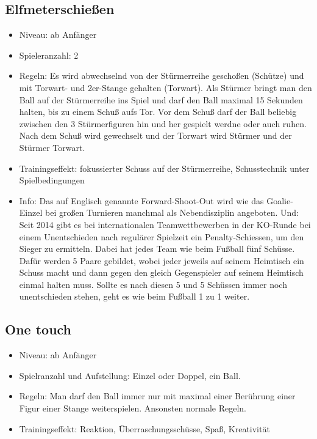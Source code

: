 \subsection{Elfmeterschießen}
\label{spielformen:sonderregeln:elfmeter}

\begin{itemize}
\item Niveau: ab Anfänger
\item Spieleranzahl: 2
\item Regeln: Es wird abwechselnd von der Stürmerreihe geschoßen (Schütze) und mit Torwart- und 2er-Stange gehalten (Torwart). Als Stürmer bringt man den Ball auf der Stürmerreihe ins Spiel und darf den Ball maximal 15 Sekunden halten, bis zu einem Schuß aufs Tor. Vor dem Schuß darf der Ball beliebig zwischen den 3 Stürmerfiguren hin und her gespielt werdne oder auch ruhen. 
Nach dem Schuß wird gewechselt und der Torwart wird Stürmer und der Stürmer Torwart.
\item Trainingseffekt: fokussierter Schuss auf der Stürmerreihe, Schusstechnik unter Spielbedingungen
\item Info: Das auf Englisch genannte Forward-Shoot-Out wird wie das Goalie-Einzel bei großen Turnieren manchmal als Nebendisziplin angeboten. 
Und: Seit 2014 gibt es bei internationalen Teamwettbewerben in der KO-Runde bei einem Unentschieden nach regulärer Spielzeit ein Penalty-Schiessen, um den Sieger zu ermitteln. Dabei hat jedes Team wie beim Fußball fünf Schüsse. Dafür werden 5 Paare gebildet, wobei jeder jeweils auf seinem Heimtisch ein Schuss macht und dann gegen den gleich Gegenspieler auf seinem Heimtisch einmal halten muss. Sollte es nach diesen 5 und 5 Schüssen immer noch unentschieden stehen, geht es wie beim Fußball 1 zu 1 weiter.
\end{itemize}


\subsection{One touch}
\label{spielformen:sonderregeln:onetouch}

\begin{itemize}
\item Niveau: ab Anfänger
\item Spielranzahl und Aufstellung: Einzel oder Doppel, ein Ball.
\item Regeln: Man darf den Ball immer nur mit maximal einer Berührung einer Figur einer Stange weiterspielen. Ansonsten normale Regeln.
\item Trainingseffekt: Reaktion, Überraschungsschüsse, Spaß, Kreativität
\end{itemize}



